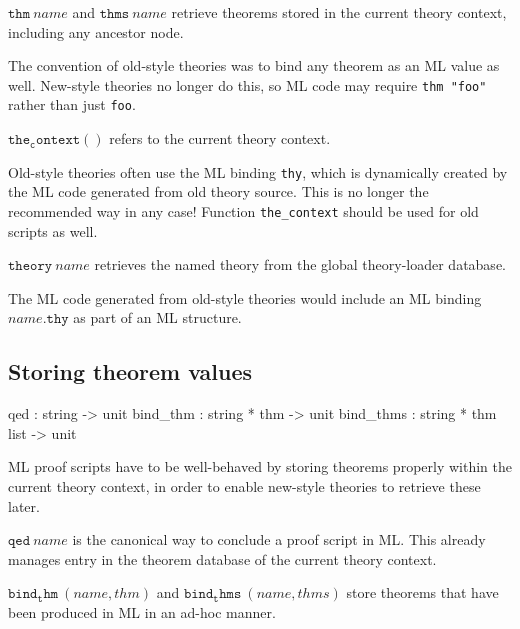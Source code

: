 \begin{descr}
\item [$\mathtt{thm}~name$ and $\mathtt{thms}~name$] retrieve theorems stored
  in the current theory context, including any ancestor node.

  The convention of old-style theories was to bind any theorem as an ML value
  as well.  New-style theories no longer do this, so ML code may require
  \texttt{thm~"foo"} rather than just \texttt{foo}.

\item [$\mathtt{the_context()}$] refers to the current theory context.

  Old-style theories often use the ML binding \texttt{thy}, which is
  dynamically created by the ML code generated from old theory source.  This
  is no longer the recommended way in any case!  Function \texttt{the_context}
  should be used for old scripts as well.

\item [$\mathtt{theory}~name$] retrieves the named theory from the global
  theory-loader database.

  The ML code generated from old-style theories would include an ML binding
  $name\mathtt{.thy}$ as part of an ML structure.
\end{descr}


\subsection{Storing theorem values}

\begin{ttbox}
qed        : string -> unit
bind_thm   : string * thm -> unit
bind_thms  : string * thm list -> unit
\end{ttbox}

ML proof scripts have to be well-behaved by storing theorems properly within
the current theory context, in order to enable new-style theories to retrieve
these later.

\begin{descr}

\item [$\mathtt{qed}~name$] is the canonical way to conclude a proof script in
  ML.  This already manages entry in the theorem database of the current
  theory context.

\item [$\mathtt{bind_thm}~(name, thm)$ and $\mathtt{bind_thms}~(name, thms)$]
  store theorems that have been produced in ML in an ad-hoc manner.

\end{descr}

